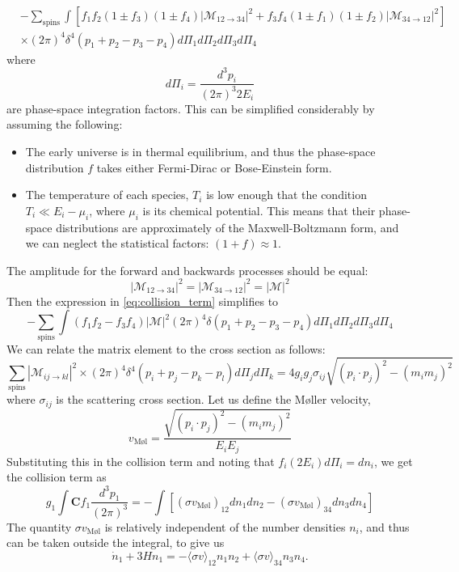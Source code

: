 \begin{equation}\label{eq:collision_term}
  \begin{split}
  &-\sum_\text{spins}\int [f_1 f_2(1\pm f_3)(1\pm f_4)|\mathcal{M}_{12\rightarrow 34}|^2 + f_3 f_4(1\pm f_1)(1\pm f_2)|\mathcal{M}_{34\rightarrow 12}|^2]\\
&\times(2\pi)^4\delta^4(p_1+p_2-p_3-p_4)d\Pi_1 d\Pi_2 d\Pi_3 d\Pi_4
\end{split}
\end{equation}
where
\[d\Pi_i = \frac{d^3 p_i}{(2\pi)^3 2E_i}\]
are phase-space integration factors. This can be simplified considerably by assuming the following:
\begin{itemize}
  \item The early universe is in thermal equilibrium, and thus the phase-space distribution $f$ takes either Fermi-Dirac or Bose-Einstein form.
  \item The temperature of each species, $T_i$ is low enough that the condition $T_i \ll E_i - \mu_i$, where $\mu_i$ is its chemical potential. This means that their phase-space distributions are approximately of the Maxwell-Boltzmann form, and we can neglect the statistical factors: $(1+f)\approx 1$.
\end{itemize}
The amplitude for the forward and backwards processes should be equal:
\[|\mathcal{M}_{12\rightarrow 34}|^2 = |\mathcal{M}_{34\rightarrow 12}|^2 = |\mathcal{M}|^2 \]
Then the expression in \autoref{eq:collision_term} simplifies to
\begin{equation}
-\sum_\text{spins}\int(f_1 f_2 - f_3 f_4)|\mathcal{M}|^2(2\pi)^4\delta(p_1 + p_2 - p_3 - p_4)d\Pi_1 d\Pi_2 d\Pi_3 d\Pi_4
\end{equation}
We can relate the matrix element to the cross section as follows:
\[\sum_\text{spins}|\mathcal{M}_{ij\rightarrow kl}|^2\times(2\pi)^4\delta^4(p_i + p_j - p_k -p_l)d\Pi_jd\Pi_k = 4g_ig_j\sigma_{ij}\sqrt{(p_i\cdot p_j)^2 - (m_im_j)^2}\]
where $\sigma_{ij}$ is the scattering cross section. Let us define the M\o ller velocity,
\[v_\text{M\o l} = \frac{\sqrt{(p_i\cdot p_j)^2 - (m_im_j)^2}}{E_iE_j}\]
Substituting this in the collision term and noting that $f_i(2E_i)d\Pi_i = dn_i$, we get the collision term as
\[g_1\int \mathbf{C}f_1\frac{d^3p_1}{(2\pi)^3} = -\int[(\sigma v_\text{M\o l})_{12}dn_1dn_2 - (\sigma v_\text{M\o l})_{34}dn_3dn_4]\]
The quantity $\sigma v_\text{M\o l}$ is relatively independent of the number densities $n_i$, and thus can be taken outside the integral, to give us
\[\dot{n}_1 + 3Hn_1 = -\langle\sigma v\rangle_{12}n_1n_2 + \langle\sigma v\rangle_{34}n_3n_4.\]
